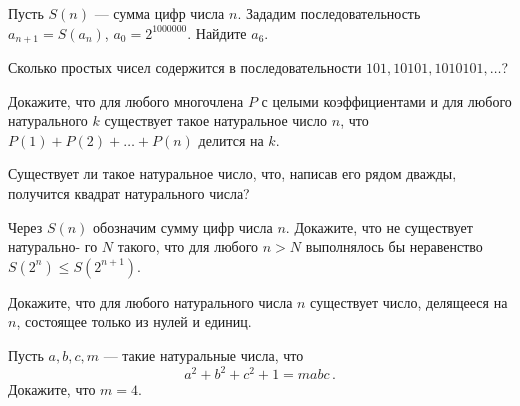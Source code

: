 \resetproblem \begingroup %
    \def\jeolmdate{5 декабря 2018 г.}%
    \def\jeolmauthors{Орлов О.\,П., Тихонов Ю.\,В.}%
\jeolmheader \endgroup


\begin{problems}

\item Пусть $S(n)$ --- сумма цифр числа $n$. Зададим последовательность $a_{n + 1} = S(a_n)$, $a_0 = 2^{1000000}$. Найдите $a_6$.

\item Сколько простых чисел содержится в последовательности $101, 10101, 1010101, \ldots$?

\item Докажите, что для любого многочлена $P$ с целыми коэффициентами и для любого натурального $k$ существует такое натуральное число $n$, что $P(1) + P(2) + \ldots + P(n)$ делится на $k$.

\item Существует ли такое натуральное число, что, написав его рядом дважды, получится квадрат натурального числа?

\item Через $S(n)$ обозначим сумму цифр числа $n$. Докажите, что не существует натурально-
го $N$ такого, что для любого $n > N$ выполнялось бы неравенство $S(2^n ) \le S(2^{n+1 })$.

\item Докажите, что для любого натурального числа $n$ существует число, делящееся на $n$, состоящее только из нулей и единиц.

\item Пусть $a, b, c, m$ --- такие натуральные числа, что
\[
    a^2 + b^2 + c^2 + 1 = m a b c
\, . \]
Докажите, что $m = 4$.

\end{problems}

